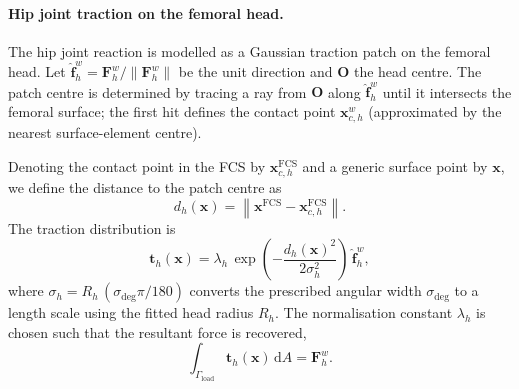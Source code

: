 \paragraph{Hip joint traction on the femoral head.}
The hip joint reaction is modelled as a Gaussian traction patch on the femoral head. Let $\hat{\mathbf{f}}_h^w=\mathbf{F}_h^w/\lVert\mathbf{F}_h^w\rVert$ be the unit direction and $\mathbf{O}$ the head centre. The patch centre is determined by tracing a ray from $\mathbf{O}$ along $\hat{\mathbf{f}}_h^w$ until it intersects the femoral surface; the first hit defines the contact point $\mathbf{x}_{c,h}^w$ (approximated by the nearest surface-element centre).

Denoting the contact point in the FCS by $\mathbf{x}_{c,h}^{\mathrm{FCS}}$ and a generic surface point by $\mathbf{x}$, we define the distance to the patch centre as
\begin{equation}
d_h(\mathbf{x})=\left\lVert \mathbf{x}^{\mathrm{FCS}}-\mathbf{x}_{c,h}^{\mathrm{FCS}}\right\rVert.
\end{equation}
The traction distribution is
\begin{equation}
\mathbf{t}_h(\mathbf{x})=\lambda_h\,\exp\!\left(-\frac{d_h(\mathbf{x})^2}{2\sigma_h^2}\right)\,\hat{\mathbf{f}}_h^w,
\label{eq:hip_traction_continuous}
\end{equation}
where $\sigma_h = R_h\,(\sigma_{\deg}\pi/180)$ converts the prescribed angular width $\sigma_{\deg}$ to a length scale using the fitted head radius $R_h$.
 The normalisation constant $\lambda_h$ is chosen such that the resultant force is recovered,
\begin{equation}
\int_{\Gamma_{\mathrm{load}}}\mathbf{t}_h(\mathbf{x})\,\mathrm{d}A = \mathbf{F}_h^w.
\label{eq:hip_resultant_condition}
\end{equation}


